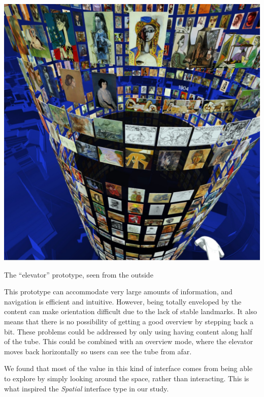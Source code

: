 \documentclass[nobib]{tufte-book} %
\begin{document}
\begin{marginfigure}
  \includegraphics[width=\linewidth]{picassooutside.jpg}
  \caption{The ``elevator'' prototype, seen from the outside}
  \label{fig:picassooutside}
\end{marginfigure}

This prototype can accommodate very large amounts of information, and navigation is efficient and intuitive. However, being totally enveloped by the content can make orientation difficult due to the lack of stable landmarks. It also means that there is no possibility of getting a good overview by stepping back a bit. These problems could be addressed by only using having content along half of the tube. This could be combined with an overview mode, where the elevator moves back horizontally so users can see the tube from afar.

We found that most of the value in this kind of interface comes from being able to explore by simply looking around the space, rather than interacting. This is what inspired the \emph{Spatial} interface type in our study.
\end{document}
